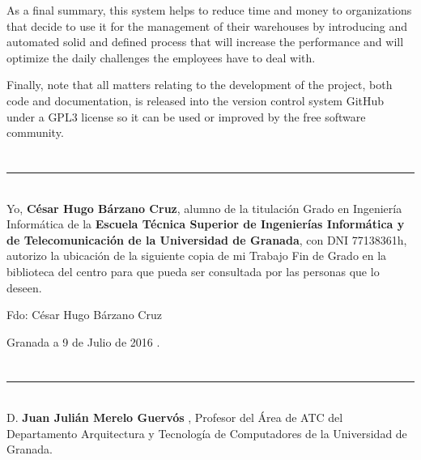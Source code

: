 As a final summary, this system helps to reduce time and money to organizations that decide to use it for the management of their warehouses by introducing and automated solid and defined process that will increase the performance and will optimize the daily challenges the employees have to deal with. 

Finally, note that all matters relating to the development of the project, both code and documentation, is released into the version control system GitHub under a GPL3 license so it can be used or improved by the free software community. 


\chapter*{}
\thispagestyle{empty}

\noindent\rule[-1ex]{\textwidth}{2pt}\\[4.5ex]

Yo, \textbf{César Hugo Bárzano Cruz}, alumno de la titulación Grado en Ingeniería Informática de la \textbf{Escuela Técnica Superior de Ingenierías Informática y de Telecomunicación de la Universidad de Granada}, con DNI 77138361h, autorizo la ubicación de la siguiente copia de mi Trabajo Fin de Grado en la biblioteca del centro para que pueda ser consultada por las personas que lo deseen.

\vspace{6cm}

\noindent Fdo: César Hugo Bárzano Cruz

\vspace{2cm}

\begin{flushright}
Granada a 9 de Julio de 2016 .
\end{flushright}


\chapter*{}
\thispagestyle{empty}

\noindent\rule[-1ex]{\textwidth}{2pt}\\[4.5ex]

D. \textbf{Juan Julián Merelo Guervós }, Profesor del Área de ATC del Departamento Arquitectura y Tecnología de Computadores de la Universidad de Granada.

\vspace{0.5cm}


\vspace{0.5cm}

